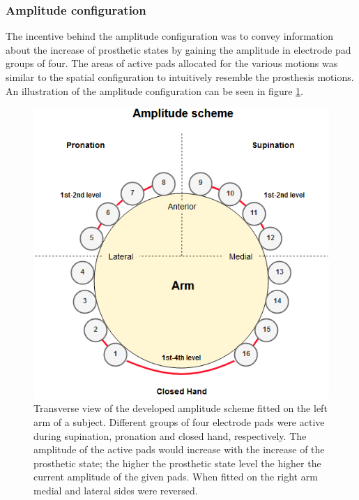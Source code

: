 \subsubsection{Amplitude configuration}
The incentive behind the amplitude configuration was to convey information about the increase of prosthetic states by gaining the amplitude in electrode pad groups of four.
The areas of active pads allocated for the various motions was similar to the spatial configuration to intuitively resemble the prosthesis motions. An illustration of the amplitude configuration can be seen in figure \ref{fig:pa:amplitude}. 
 \begin{figure}[h]                 
	\includegraphics[width=.9\textwidth]{figures/El_array_amplitude}  
	\caption{Transverse view of the developed amplitude scheme fitted on the left arm of a subject. Different groups of four electrode pads were active during supination, pronation and closed hand, respectively. The amplitude of the active pads would increase with the increase of the prosthetic state; the higher the prosthetic state level the higher the current amplitude of the given pads. When fitted on the right arm medial and lateral sides were reversed.}
	\label{fig:pa:amplitude} 
\end{figure}


